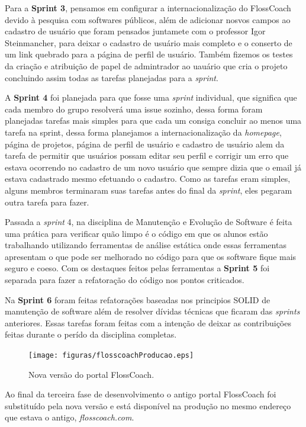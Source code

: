 Para a \textbf{Sprint 3}, pensamos em configurar a internacionalização do FlossCoach
devido à pesquisa com softwares públicos, além de adicionar nosvos campos ao cadastro 
de usuário que foram pensados juntamete com o professor Igor Steinmancher, para deixar o cadastro de usuário 
mais completo e o conserto de um link quebrado para a página de perfil de usuário.
Também fizemos os testes da criação e atribuição de papel de admintrador ao uauário
que cria o projeto concluindo assim todas as tarefas planejadas para a \textit{sprint}.

A \textbf{Sprint 4} foi planejada para que fosse uma \textit{sprint} individual, que
significa que cada membro do grupo resolverá uma issue sozinho, dessa forma foram 
planejadas tarefas mais simples para que cada um consiga concluir ao menos uma
tarefa na sprint, dessa forma planejamos a internacionalização da \textit{homepage},
página de projetos, página de perfil de usuário e cadastro de usuário alem da 
tarefa de permitir que usuários possam editar seu perfil e corrigir um erro que
estava ocorrendo no cadastro de um novo usuário que sempre dizia que o email já
estava cadastrado mesmo efetuando o  cadastro. Como as tarefas eram simples,
alguns membros terminaram suas tarefas antes do final da \textit{sprint}, eles 
pegaram outra tarefa para fazer.

Passada a \textit{sprint} 4, na disciplina de Manutenção e Evolução de Software é feita uma prática
para verificar quão limpo é o código em que os alunos estão trabalhando utilizando
ferramentas de análise estática onde essas ferramentas apresentam o que pode ser melhorado 
no código para que os software fique mais seguro e coeso. Com os destaques feitos pelas
ferramentas a \textbf{Sprint 5} foi separada para fazer a refatoração do código
nos pontos criticados.

Na \textbf{Sprint 6} foram feitas refatorações baseadas nos principios SOLID de
manutenção de software além de resolver dívidas técnicas que ficaram das \textit{sprints}
anteriores. Essas tarefas foram feitas com a intenção de deixar as contribuições feitas
durante o perído da disciplina completas.  

\begin{figure}[h]
	\centering
	\label{fig:producao}
		\texttt{[image: figuras/flosscoachProducao.eps]}
	\caption{Nova versão do portal FlossCoach.}
\end{figure}

Ao final da terceira fase de desenvolvimento o antigo portal FlossCoach foi substituído pela
nova versão e está disponível na produção no mesmo endereço que estava o antigo, \textit{flosscoach.com}.
